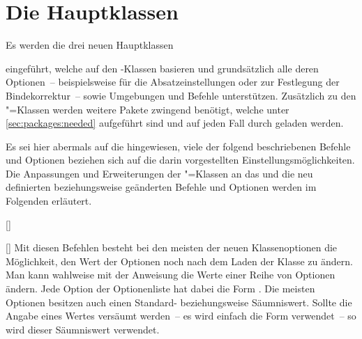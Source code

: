 \chapter[%
  Die Hauptklassen \Class*{tudscrbook}, \Class*{tudscrreprt} und 
  \Class*{tudscrartcl}%
]{Die Hauptklassen}
%
%
%
%
\begin{Declaration*}{}
\begin{Declaration*}{}
\begin{Declaration*}{}
Es werden die drei neuen Hauptklassen
%
\begin{description}
\item {}
\item {}
\item {}
\end{description}
%
eingeführt, welche auf den \KOMAScript-Klassen basieren und grundsätzlich alle 
deren Optionen~-- beispielsweise  für die 
Absatzeinstellungen oder  zur Festlegung der 
Bindekorrektur~-- sowie Umgebungen und Befehle unterstützen. Zusätzlich zu den 
\KOMAScript"=Klassen werden weitere Pakete zwingend benötigt, welche unter 
\autoref{sec:packages:needed} aufgeführt sind und auf jeden Fall durch 
\TUDScript geladen werden.

Es sei hier abermals auf die  
hingewiesen, viele der folgend beschriebenen Befehle und Optionen beziehen sich 
auf die darin vorgestellten Einstellungsmöglichkeiten. Die Anpassungen und 
Erweiterungen der \KOMAScript"=Klassen an das \CD und die neu definierten 
beziehungsweise geänderten Befehle und Optionen werden im Folgenden erläutert.

\begin{Declaration}{[]}
\begin{Declaration}{[]}
\printdeclarationlist%
%
%
Mit diesen Befehlen besteht bei den meisten der neuen Klassenoptionen die 
Möglichkeit, den Wert der Optionen noch nach dem Laden der Klasse zu ändern.
Man kann wahlweise mit der Anweisung  die Werte einer Reihe 
von Optionen ändern. Jede Option der Optionenliste hat dabei die Form
\PValue{=}. Die meisten Optionen besitzen auch einen 
Standard- beziehungsweise Säumniswert. Sollte die Angabe eines Wertes versäumt 
werden~-- es wird einfach die Form  verwendet~-- so wird dieser 
Säumniswert verwendet.


\end{Declaration}
\end{Declaration}
\end{Declaration*}
\end{Declaration*}
\end{Declaration*}
